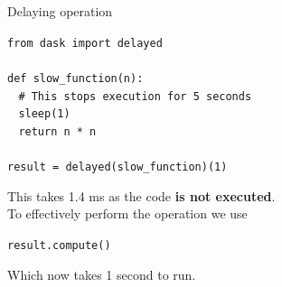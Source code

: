 \documentclass[9pt, aspectratio=169]{beamer}
\begin{document}
\begin{frame}
	{Delaying operation}
	\begin{codebox}
		\texttt{from dask import delayed\\
			\\
			def slow\_function(n):\\
			$~~~~$\# This stops execution for 5 seconds\\
			$~~~~$sleep(1)\\
			$~~~~$return n * n\\
			\\
			result = delayed(slow\_function)(1)
		}
	\end{codebox}
	\pause
	This takes 1.4 ms as the code \textbf{is not executed}.\\
	To effectively perform the operation we use

	\begin{codebox}
		\texttt{result.compute()}
	\end{codebox}

	Which now takes 1 second to run.
\end{frame}
\end{document}
